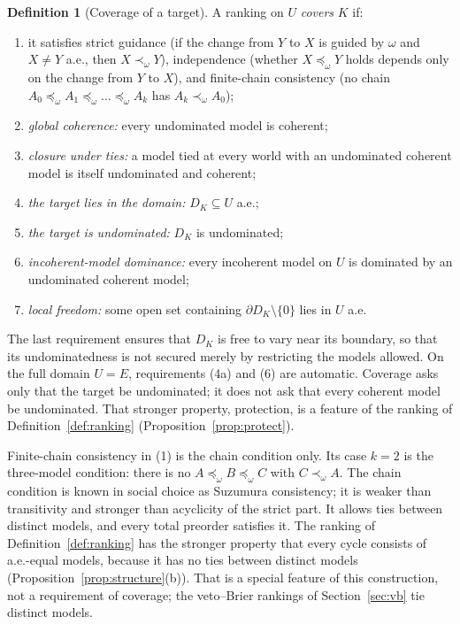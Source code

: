 \documentclass[11pt]{article}
\theoremstyle{plain}
\theoremstyle{definition}
\newtheorem{definition}[theorem]{Definition}
\theoremstyle{remark}
\begin{document}
\begin{definition}[Coverage of a target]\label{def:coverage}
A ranking on $U$
\emph{covers} $K$ if:
\begin{enumerate}
  \item[(1)] it satisfies strict guidance (if the change from $Y$ to $X$ is guided by $\omega$
  and $X\ne Y$ a.e., then $X\prec_\omega Y$), independence (whether $X\preceq_\omega Y$ holds
  depends only on the change from $Y$ to $X$), and finite-chain consistency (no chain
  $A_0\preceq_\omega A_1\preceq_\omega\dots\preceq_\omega A_k$ has $A_k\prec_\omega A_0$);
  \item[(2)] \emph{global coherence:} every undominated model is coherent;
  \item[(3)] \emph{closure under ties:} a model tied at every world with an undominated coherent
  model is itself undominated and coherent;
  \item[(4a)] \emph{the target lies in the domain:} $D_K\subseteq U$ a.e.;
  \item[(4b)] \emph{the target is undominated:} $D_K$ is undominated;
  \item[(5)] \emph{incoherent-model dominance:} every incoherent model on $U$ is dominated by an
  undominated coherent model;
  \item[(6)] \emph{local freedom:} some open set containing $\partial D_K\setminus\{0\}$ lies in
  $U$ a.e.
\end{enumerate}
\end{definition}

The last requirement ensures that $D_K$ is free to vary near its boundary, so that its
undominatedness is not secured merely by restricting the models allowed. On the full domain
$U=E$, requirements (4a) and (6) are automatic. Coverage asks only that the target be
undominated; it does not ask that every coherent model be undominated. That stronger property,
protection, is a feature of the ranking of Definition~\ref{def:ranking}
(Proposition~\ref{prop:protect}).

Finite-chain consistency in (1) is the chain condition only. Its case $k=2$ is the three-model
condition: there is no $A\preceq_\omega B\preceq_\omega C$ with $C\prec_\omega A$. The chain
condition is known in social choice as Suzumura consistency; it is weaker than transitivity and
stronger than acyclicity of the strict part. It allows ties between distinct models, and every
total preorder satisfies it. The ranking of Definition~\ref{def:ranking} has the stronger
property that every cycle consists of a.e.-equal models, because it has no ties between distinct
models (Proposition~\ref{prop:structure}(b)). That is a special feature of this construction,
not a requirement of coverage; the veto--Brier rankings of Section~\ref{sec:vb} tie distinct
models.
\end{document}
